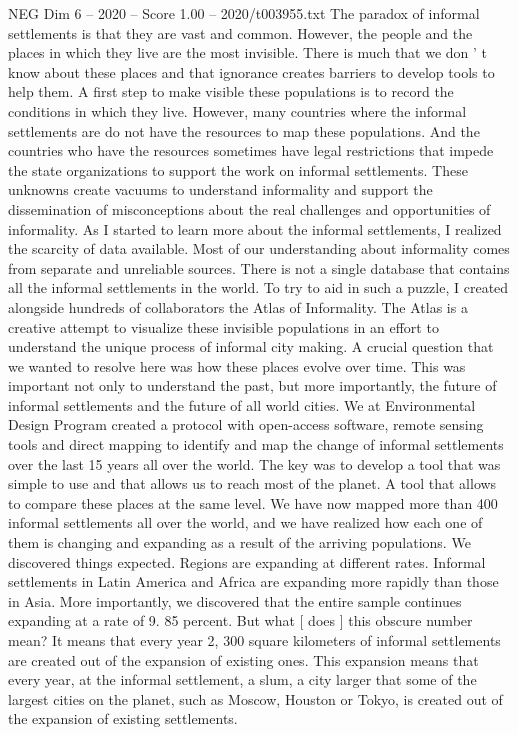 \begin{textsample}{NEG Dim 6 – 2020 – Score 1.00 – 2020/t003955.txt}
The paradox of informal settlements is that they are vast and common.
However, the people and the places in which they live are the most invisible.
There is much that we don ' t know about these places and that ignorance creates barriers to develop tools to help them.
A first step to make visible these populations is to record the conditions in which they live.
However, many countries where the informal settlements are do not have the resources to map these populations.
And the countries who have the resources sometimes have legal restrictions that impede the state organizations to support the work on informal settlements.
These unknowns create vacuums to understand informality and support the dissemination of misconceptions about the real challenges and opportunities of informality.
As I started to learn more about the informal settlements, I realized the scarcity of data available.
Most of our understanding about informality comes from separate and unreliable sources.
There is not a single database that contains all the informal settlements in the world.
To try to aid in such a puzzle, I created alongside hundreds of collaborators the Atlas of Informality.
The Atlas is a creative attempt to visualize these invisible populations in an effort to understand the unique process of informal city making.
A crucial question that we wanted to resolve here was how these places evolve over time.
This was important not only to understand the past, but more importantly, the future of informal settlements and the future of all world cities.
We at Environmental Design Program created a protocol with open-access software, remote sensing tools and direct mapping to identify and map the change of informal settlements over the last 15 years all over the world.
The key was to develop a tool that was simple to use and that allows us to reach most of the planet.
A tool that allows to compare these places at the same level.
We have now mapped more than 400 informal settlements all over the world, and we have realized how each one of them is changing and expanding as a result of the arriving populations.
We discovered things expected.
Regions are expanding at different rates.
Informal settlements in Latin America and Africa are expanding more rapidly than those in Asia.
More importantly, we discovered that the entire sample continues expanding at a rate of 9. 85 percent.
But what [ does ] this obscure number mean?
It means that every year 2, 300 square kilometers of informal settlements are created out of the expansion of existing ones.
This expansion means that every year, at the informal settlement, a slum, a city larger that some of the largest cities on the planet, such as Moscow, Houston or Tokyo, is created out of the expansion of existing settlements.

\end{textsample}
